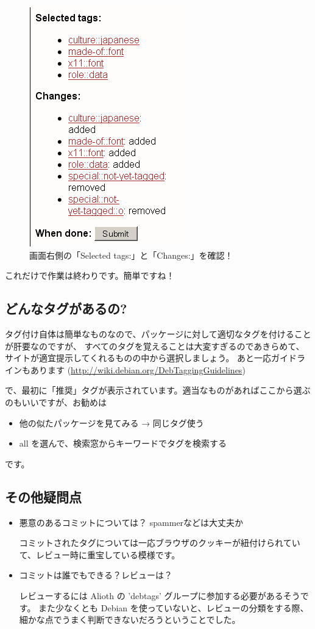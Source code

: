 \documentclass[mingoth,a4paper]{jsarticle}
\begin{document}
\begin{figure}[H]
\begin{center}
 \includegraphics[height=0.5\hsize] {image201004/gotagging03.png}
 \caption{画面右側の「Selected tags:」と「Changes:」を確認！}
\label{fig:gotagging03}
\end{center}
\end{figure}


これだけで作業は終わりです。簡単ですね！


\subsection{どんなタグがあるの?}

タグ付け自体は簡単なものなので、パッケージに対して適切なタグを付けることが肝要なのですが、
すべてのタグを覚えることは大変すぎるのであきらめて、
サイトが適宜提示してくれるものの中から選択しましょう。
あと一応ガイドラインもあります (\url{http://wiki.debian.org/DebTaggingGuidelines})

で、最初に「推奨」タグが表示されています。適当なものがあればここから選ぶのもいいですが、お勧めは
\begin{itemize}
 \item 他の似たパッケージを見てみる → 同じタグ使う
 \item all を選んで、検索窓からキーワードでタグを検索する
\end{itemize}
です。


\subsection{その他疑問点}

\begin{itemize}
 \item 悪意のあるコミットについては？ spammerなどは大丈夫か

        コミットされたタグについては一応ブラウザのクッキーが紐付けられていて、レビュー時に重宝している模様です。

 \item コミットは誰でもできる？レビューは？
 
        レビューするには Alioth の 'debtags' グループに参加する必要があるそうです。
        また少なくとも Debian を使っていないと、レビューの分類をする際、細かな点でうまく判断できないだろうということでした。
\end{itemize}
\end{document}
